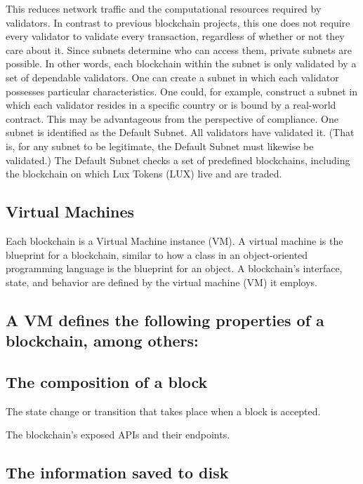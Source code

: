 \documentclass[11pt]{article}
\begin{document}
This reduces network traffic and the computational resources required by validators. In contrast to previous blockchain projects, this one does not require every validator to validate every transaction, regardless of whether or not they care about it. Since subnets determine who can access them, private subnets are possible. In other words, each blockchain within the subnet is only validated by a set of dependable validators. One can create a subnet in which each validator possesses particular characteristics. One could, for example, construct a subnet in which each validator resides in a specific country or is bound by a real-world contract. This may be advantageous from the perspective of compliance. One subnet is identified as the Default Subnet. All validators have validated it. (That is, for any subnet to be legitimate, the Default Subnet must likewise be validated.) The Default Subnet checks a set of predefined blockchains, including the blockchain on which Lux Tokens (LUX) live and are traded.


\subsection{Virtual Machines}

Each blockchain is a Virtual Machine instance (VM). A virtual machine is the blueprint for a blockchain, similar to how a class in an object-oriented programming language is the blueprint for an object. A blockchain's interface, state, and behavior are defined by the virtual machine (VM) it employs.


\subsection{A VM defines the following properties of a blockchain, among others:}

\subsection{The composition of a block}

The state change or transition that takes place when a block is accepted.


The blockchain's exposed APIs and their endpoints.


\subsection{The information saved to disk}
\end{document}

